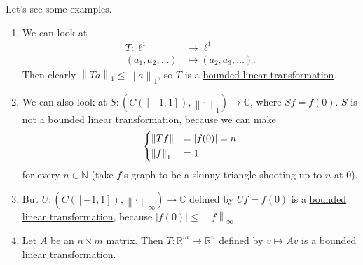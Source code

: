 \begin{eg}
	Let's see some examples.
	\begin{enumerate}
		\item We can look at
		      \[
			      \begin{split}
				      T \colon \ell^1       & \to \ell^1                \\
				      (a_1,a_2,\ldots) & \mapsto (a_2,a_3,\ldots).
			      \end{split}
		      \]
		      Then clearly \(\left\lVert Ta\right\rVert_1 \leq \left\lVert a\right\rVert _1\), so \(T\) is a \hyperref[def:bounded-linear-transformation]{bounded linear transformation}.
		\item We can also look at $S : (C([-1,1]),\left\lVert \cdot\right\rVert _1) \to \mathbb{C}$, where $Sf = f(0)$. $S$ is not a \hyperref[def:bounded-linear-transformation]{bounded linear transformation},
		      because we can make
		      \[
			      \begin{dcases}
				      \left\lVert Tf\right\rVert  & = \left\vert f(0) \right\vert  = n \\
				      \left\lVert f\right\rVert_1 & = 1
			      \end{dcases}
		      \]
		      for every \(n \in \mathbb{N}\) (take \(f\)'s graph to be a skinny triangle shooting up to \(n\) at \(0\)).
		\item But \(U \colon (C([-1,1]), \left\lVert \cdot\right\rVert _\infty) \to \mathbb{C}\) defined by \(Uf = f(0)\) is a \hyperref[def:bounded-linear-transformation]{bounded linear transformation},
		      because \(\left\vert f(0) \right\vert \leq \left\lVert f\right\rVert_\infty\).
		\item Let \(A\) be an \(n \times m\) matrix. Then \(T \colon \mathbb{R}^m \to \mathbb{R}^n\) defined by \(v \mapsto Av\) is a
		      \hyperref[def:bounded-linear-transformation]{bounded linear transformation}.


\end{enumerate}
\end{eg}
